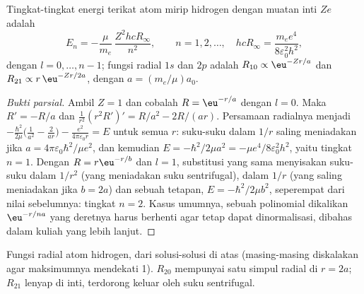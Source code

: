 \begin{theorem}\label{thm:b3:quantum-model-systems:hydrogen}
Tingkat-tingkat energi terikat atom mirip hidrogen dengan muatan inti $Ze$ adalah
\[
E_n = -\frac{\mu}{m_e}\,\frac{Z^2hcR_\infty}{n^2}, \qquad n = 1, 2, \dots,
\quad hcR_\infty = \frac{m_ee^4}{8\varepsilon_0^2h^2},
\]
dengan $l = 0, \dots, n - 1$; fungsi radial $1s$ dan $2p$ adalah $R_{10}
\propto \eu^{-Zr/a}$ dan $R_{21} \propto r\,\eu^{-Zr/2a}$, dengan $a =
(m_e/\mu)a_0$.
\end{theorem}

\begin{proof}[Bukti parsial]
Ambil $Z = 1$ dan cobalah $R = \eu^{-r/a}$ dengan $l = 0$. Maka $R' = -R/a$ dan
$\frac{1}{r^2}(r^2R')' = R/a^2 - 2R/(ar)$. Persamaan radialnya menjadi
$-\frac{\hbar^2}{2\mu}\big(\frac{1}{a^2} - \frac{2}{ar}\big) - \frac{e^2}{4\pi
\varepsilon_0r} = E$ untuk semua $r$: suku-suku dalam $1/r$ saling meniadakan
jika $a =
4\pi\varepsilon_0\hbar^2/\mu e^2$, dan kemudian $E = -\hbar^2/2\mu a^2 = -\mu
e^4/8\varepsilon_0^2h^2$, yaitu tingkat $n = 1$. Dengan $R = r\eu^{-r/b}$ dan
$l = 1$, substitusi yang sama menyisakan suku-suku dalam $1/r^2$ (yang
meniadakan suku sentrifugal), dalam $1/r$ (yang saling meniadakan jika
$b = 2a$) dan sebuah tetapan, $E =
-\hbar^2/2\mu b^2$, seperempat dari nilai
sebelumnya: tingkat $n = 2$. Kasus umumnya, sebuah polinomial dikalikan
$\eu^{-r/na}$ yang deretnya harus berhenti agar tetap dapat dinormalisasi,
dibahas dalam kuliah yang lebih lanjut.
\end{proof}

\begin{omfigure}

{\small Fungsi radial atom hidrogen, dari solusi-solusi di atas (masing-masing
diskalakan agar maksimumnya mendekati 1). $R_{20}$ mempunyai satu simpul
radial di $r = 2a$; $R_{21}$ lenyap di inti, terdorong keluar oleh suku
sentrifugal.}
\end{omfigure}

